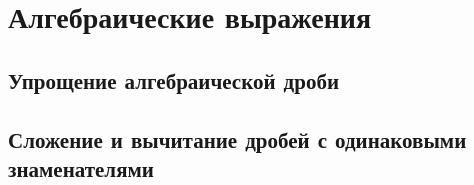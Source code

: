 \section{Алгебраические выражения}
	\subsection{Упрощение алгебраической дроби}
	\subsection{Сложение и вычитание дробей с одинаковыми знаменателями}
